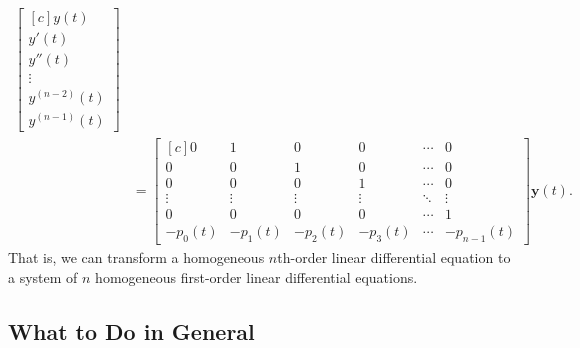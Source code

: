 \documentclass{myart}
\renewcommand{\vec}[1]{\mathbf{#1}}
\newcommand{\mat}[2][r]{\begin{bmatrix*}[#1] #2 \end{bmatrix*}}
\begin{document}
\begin{align*}
{     }
     \mat[c]{
       y(t)         \\
       y'(t)        \\
       y''(t)       \\
       \vdots       \\
       y^{(n-2)}(t) \\
       y^{(n-1)}(t)
     } \\
  &= \mat[c]{
        0      &  1      &  0      &  0      & \cdots &  0          \\
        0      &  0      &  1      &  0      & \cdots &  0          \\
        0      &  0      &  0      &  1      & \cdots &  0          \\
        \vdots &  \vdots &  \vdots &  \vdots & \ddots &  \vdots     \\
        0      &  0      &  0      &  0      & \cdots &  1          \\
       -p_0(t) & -p_1(t) & -p_2(t) & -p_3(t) & \cdots & -p_{n-1}(t)
     } \vec y(t).
\end{align*}
That is, we can transform a homogeneous $n$th-order linear
differential equation to a system of $n$ homogeneous first-order
linear differential equations.

\subsection{What to Do in General}
\label{subsec:higher order strategy}
\end{document}
